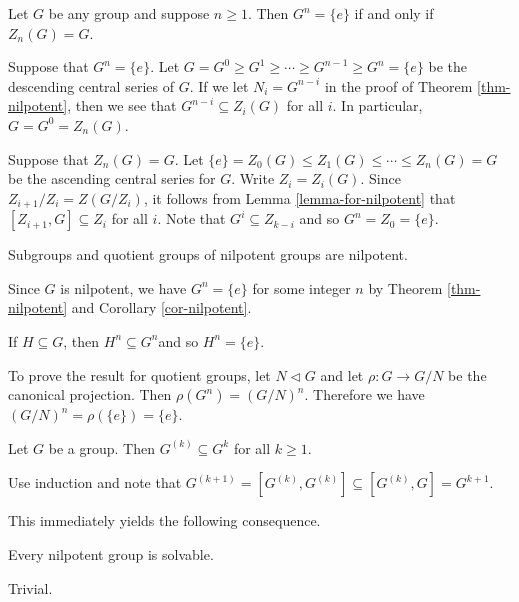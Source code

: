  
 
\begin{corollary} \label{cor-nilpotent}
	Let $G$ be any group and suppose $n \geq 1$. Then $G^{n} = \{e\}$ if and only if $Z_n(G) = G$.
\end{corollary}
\begin{sketch}
	Suppose that $G^{n} = \{e\}$. Let 
	$G=G^0 \geq  G^{1}\geq \cdots \geq G^{n-1} \geq G^n = \{e\}$  be the descending central series of $G$. If we let $N_{i} = G^{n-i}$ in the proof of Theorem \ref{thm-nilpotent}, then we see that $G^{n-i}\subseteq Z_i(G)$ for all $i$. In particular, $G = G^0 = Z_n(G)$.
	
	Suppose that $Z_n(G) =G$. Let $\{e\} = Z_0(G) \leq Z_1(G) \leq \cdots \leq Z_n(G) = G$ be the ascending central series for $G$. Write $Z_i = Z_i(G)$. Since $Z_{i+1}/Z_i = Z(G/Z_i)$, it follows from Lemma \ref{lemma-for-nilpotent} that  $[Z_{i+1}, G] \subseteq Z_i$ for all $i$. Note that $G^i \subseteq Z_{k-i}$ and so $G^{n} = Z_0 = \{e\}$.
\end{sketch}



\begin{corollary}
	Subgroups and quotient groups of nilpotent groups are nilpotent.
\end{corollary}
\begin{sketch}
	Since $G$ is nilpotent, we have $G^n = \{e\}$ for some integer $n$ by Theorem \ref{thm-nilpotent} and Corollary \ref{cor-nilpotent}. 
	
	If $H \subseteq G$, then $H^n \subseteq G^n$and so $H^n = \{e\}$.
	
	To prove the result for quotient groups, let $N \lhd G$ and let $\rho : G \rightarrow G/N$ be the canonical projection. Then $\rho(G^n) = (G/N)^n$. Therefore we have $(G/N)^n = \rho(\{e\}) =\{e\}$. 
\end{sketch}

\begin{lemma}
	Let $G$ be a group. Then $G^{(k)}\subseteq G^k$ for all $k\geq 1$.
\end{lemma}
\begin{sketch}
	Use induction and note that $G^{(k+1)} = [G^{(k)},G^{(k)}] \subseteq [G^{(k)},G]  = G^{k+1}$.
\end{sketch}
This immediately yields the following consequence.
\begin{proposition} \label{prop-nil-implies-sol}
	Every nilpotent group is solvable.
\end{proposition}
\begin{sketch}
	Trivial.
\end{sketch}

